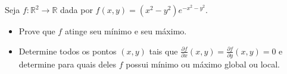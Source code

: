 Seja \(f\colon \mathbb R ^2 \rightarrow \mathbb R\) dada por \(f(x,y)=(x^2-y^2)e^{-x^2-y^2}\).
\begin{itemize}

\item[(a)] Prove que \(f\) atinge seu mínimo e seu máximo.

\item[(b)] Determine todos os pontos \((x,y)\) tais que \(\frac{\partial f}{\partial x}(x,y)=\frac{\partial f}{\partial y}(x,y)=0\) e determine para quais deles \(f\) possui mínimo ou máximo global ou local.
\end{itemize}
